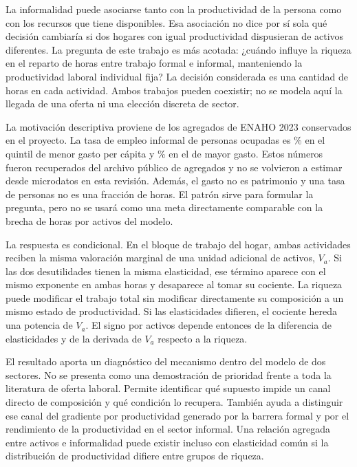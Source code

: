 \documentclass[11pt]{article}
\theoremstyle{definition}
\newcommand{\Va}{V_a}
\begin{document}
La informalidad puede asociarse tanto con la productividad de la persona como con los recursos que tiene disponibles. Esa asociación no dice por sí sola qué decisión cambiaría si dos hogares con igual productividad dispusieran de activos diferentes. La pregunta de este trabajo es más acotada: ¿cuándo influye la riqueza en el reparto de horas entre trabajo formal e informal, manteniendo la productividad laboral individual fija? La decisión considerada es una cantidad de horas en cada actividad. Ambos trabajos pueden coexistir; no se modela aquí la llegada de una oferta ni una elección discreta de sector.

La motivación descriptiva proviene de los agregados de ENAHO 2023 conservados en el proyecto. La tasa de empleo informal de personas ocupadas es \MotivationQOne\% en el quintil de menor gasto per cápita y \MotivationQFive\% en el de mayor gasto. Estos números fueron recuperados del archivo público de agregados y no se volvieron a estimar desde microdatos en esta revisión. Además, el gasto no es patrimonio y una tasa de personas no es una fracción de horas. El patrón sirve para formular la pregunta, pero no se usará como una meta directamente comparable con la brecha de horas por activos del modelo.

La respuesta es condicional. En el bloque de trabajo del hogar, ambas actividades reciben la misma valoración marginal de una unidad adicional de activos, \(\Va\). Si las dos desutilidades tienen la misma elasticidad, ese término aparece con el mismo exponente en ambas horas y desaparece al tomar su cociente. La riqueza puede modificar el trabajo total sin modificar directamente su composición a un mismo estado de productividad. Si las elasticidades difieren, el cociente hereda una potencia de \(\Va\). El signo por activos depende entonces de la diferencia de elasticidades y de la derivada de \(\Va\) respecto a la riqueza.

El resultado aporta un diagnóstico del mecanismo dentro del modelo de dos sectores. No se presenta como una demostración de prioridad frente a toda la literatura de oferta laboral. Permite identificar qué supuesto impide un canal directo de composición y qué condición lo recupera. También ayuda a distinguir ese canal del gradiente por productividad generado por la barrera formal y por el rendimiento de la productividad en el sector informal. Una relación agregada entre activos e informalidad puede existir incluso con elasticidad común si la distribución de productividad difiere entre grupos de riqueza.
\end{document}
